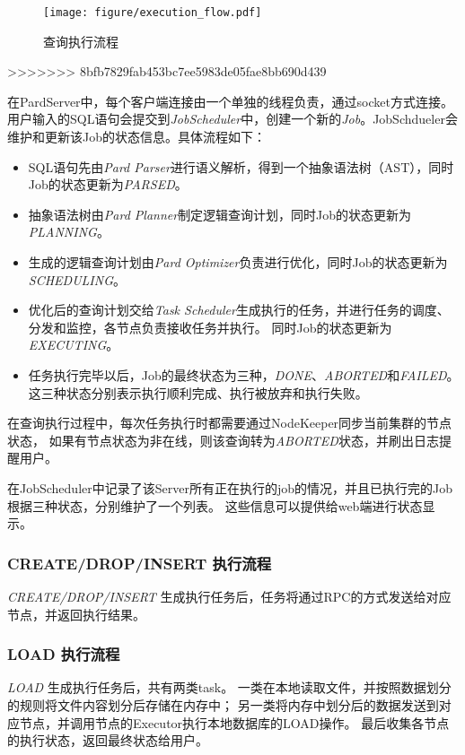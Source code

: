 \documentclass[a4paper, 12pt]{ctexart}
\begin{document}
\begin{figure}[htbp]
	\centering
	\texttt{[image: figure/execution\_flow.pdf]}
	\caption{查询执行流程}
	\label{fig:ef}
\end{figure}
>>>>>>> 8bfb7829fab453bc7ee5983de05fae8bb690d439

在PardServer中，每个客户端连接由一个单独的线程负责，通过socket方式连接。
用户输入的SQL语句会提交到\textit{JobScheduler}中，创建一个新的\textit{Job}。JobSchdueler会维护和更新该Job的状态信息。具体流程如下：
\begin{itemize}
\item SQL语句先由\textit{Pard Parser}进行语义解析，得到一个抽象语法树（AST），同时Job的状态更新为\textit{PARSED}。
\item 抽象语法树由\textit{Pard Planner}制定逻辑查询计划，同时Job的状态更新为\textit{PLANNING}。
\item 生成的逻辑查询计划由\textit{Pard Optimizer}负责进行优化，同时Job的状态更新为\textit{SCHEDULING}。
\item 优化后的查询计划交给\textit{Task Scheduler}生成执行的任务，并进行任务的调度、分发和监控，各节点负责接收任务并执行。
同时Job的状态更新为\textit{EXECUTING}。
\item 任务执行完毕以后，Job的最终状态为三种，\textit{DONE}、\textit{ABORTED}和\textit{FAILED}。这三种状态分别表示执行顺利完成、执行被放弃和执行失败。
\end{itemize}

在查询执行过程中，每次任务执行时都需要通过NodeKeeper同步当前集群的节点状态，
如果有节点状态为非在线，则该查询转为\textit{ABORTED}状态，并刷出日志提醒用户。

在JobScheduler中记录了该Server所有正在执行的job的情况，并且已执行完的Job根据三种状态，分别维护了一个列表。
这些信息可以提供给web端进行状态显示。

\subsubsection{CREATE/DROP/INSERT 执行流程}
\textit{CREATE/DROP/INSERT} 生成执行任务后，任务将通过RPC的方式发送给对应节点，并返回执行结果。

\subsubsection{LOAD 执行流程}
\textit{LOAD} 生成执行任务后，共有两类task。
一类在本地读取文件，并按照数据划分的规则将文件内容划分后存储在内存中；
另一类将内存中划分后的数据发送到对应节点，并调用节点的Executor执行本地数据库的LOAD操作。
最后收集各节点的执行状态，返回最终状态给用户。
\end{document}

